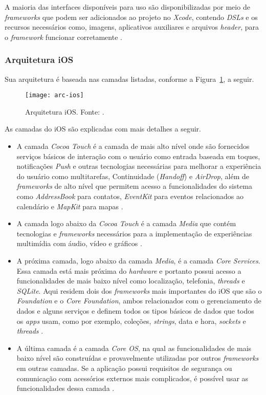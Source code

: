 A maioria das interfaces disponíveis para uso são disponibilizadas por meio de \textit{frameworks} que podem ser adicionados ao projeto no \textit{Xcode}, contendo \textit{DSLs} e os recursos necessários como, 
imagens, aplicativos auxiliares e arquivos \textit{header}, para o \textit{framework} funcionar corretamente \cite{apple_inc_tech_2014}.

\subsubsection{Arquitetura iOS} \label{subsubsection:arc-ios}
Sua arquitetura é baseada nas camadas listadas, conforme a Figura~\ref{fig:arc-ios}, a seguir.
 
\begin{figure}[H]
  \centering
    \texttt{[image: arc-ios]}
    \caption[Arquitetura iOS]{ Arquitetura iOS. Fonte: \cite{apple_inc_tech_2014}.}
	\label{fig:arc-ios}
\end{figure}

As camadas do iOS são explicadas com mais detalhes a seguir.
 
\begin{itemize}
	\item A camada \textit{Cocoa Touch} é a camada de mais alto nível onde são fornecidos serviços básicos de interação 
    com o usuário como entrada baseada em toques, notificações \textit{Push} e outras tecnologias necessárias para
     melhorar a experiência do usuário como multitarefas, Continuidade (\textit{Handoff}) e \textit{AirDrop}, além de \textit{frameworks} 
     de alto nível que permitem acesso a funcionalidades do sistema como \textit{AddressBook} para contatos, \textit{EventKit} 
     para eventos relacionados ao calendário e \textit{MapKit} para mapas \cite{apple_inc_tech_2014}.
	\item A camada logo abaixo da \textit{Cocoa Touch} é a camada \textit{Media} que contém tecnologias e \textit{frameworks} necessários 
    para a implementação de experiências multimídia com áudio, vídeo e gráficos \cite{apple_inc_tech_2014}.
	\item A próxima camada, logo abaixo da camada \textit{Media}, é a camada \textit{Core Services}. Essa camada está mais próxima 
    do \textit{hardware} e portanto possui acesso a funcionalidades de mais baixo nível como localização, telefonia, \textit{threads} 
    e \textit{SQLite}. Aqui residem dois dos \textit{frameworks} mais importantes do iOS que são o \textit{Foundation} e o \textit{Core Foundation}, 
    ambos relacionados com o gerenciamento de dados e alguns serviços e definem todos os tipos básicos de dados que 
    todos os \textit{apps} usam, como por exemplo, coleções, \textit{strings}, data e hora, \textit{sockets} e \textit{threads} \cite{apple_inc_tech_2014}.
	\item A última camada é a camada \textit{Core OS}, na qual as funcionalidades de mais baixo nível são construídas e 
    provavelmente utilizadas por outros \textit{frameworks} em outras camadas. Se a aplicação possui requisitos de segurança 
    ou comunicação com acessórios externos mais complicados, é possível usar as funcionalidades dessa camada \cite{apple_inc_tech_2014}.
\end{itemize}

